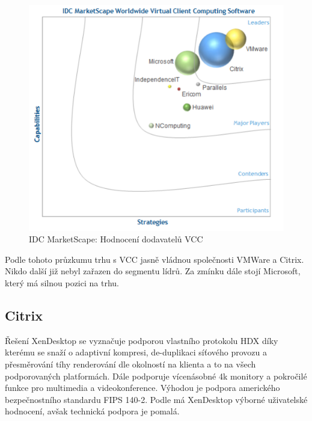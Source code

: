  \begin{figure}[h]\label{IDC_VM}
\includegraphics[width=13cm]{img/IDC_VM}
\caption{IDC MarketScape: Hodnocení dodavatelů VCC } 
\label{EMM:quadrant}
\centering
\end{figure}

Podle tohoto průzkumu trhu s VCC jasně vládnou společnosti VMWare a Citrix. Nikdo další již nebyl zařazen do segmentu lídrů. Za zmínku dále stojí Microsoft, který má silnou pozici na trhu.



\subsection{Citrix}
Řešení XenDesktop se vyznačuje podporou vlastního protokolu HDX  díky kterému se snaží o adaptivní kompresi, de-duplikaci síťového provozu a přesměrování tíhy renderování dle okolností na klienta a to na všech podporovaných platformách. Dále podporuje vícenásobné 4k monitory a pokročilé funkce pro multimedia a videokonference. Výhodou je podpora amerického bezpečnostního standardu FIPS 140-2.
Podle  má XenDesktop výborné uživatelské hodnocení, avšak technická podpora je pomalá.

